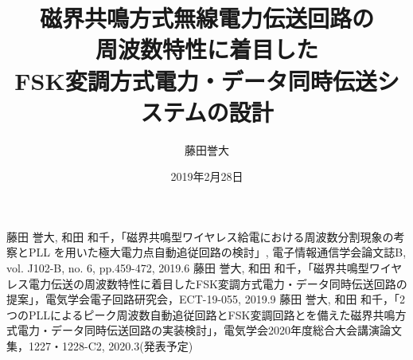 \documentclass[a4,12pt,dvipdfmx]{jreport}
\title{磁界共鳴方式無線電力伝送回路の\\周波数特性に着目した \\ FSK変調方式電力・データ同時伝送システムの設計}
\date{2019年2月28日}
\author{藤田\hspace{1zw}誉大}
\begin{document}
\maketitle[%
]

%
%
%
%            
%        




\begin{thepublished}{99}
藤田 誉大, 和田 和千，「磁界共鳴型ワイヤレス給電における周波数分割現象の考察とPLL を用いた極大電力点自動追従回路の検討」, 電子情報通信学会論文誌B, vol. J102-B, no. 6, pp.459-472, 2019.6
藤田 誉大, 和田 和千，「磁界共鳴型ワイヤレス電力伝送の周波数特性に着目したFSK変調方式電力・データ同時伝送回路の提案」，電気学会電子回路研究会，ECT-19-055, 2019.9
藤田 誉大, 和田 和千，「2つのPLLによるピーク周波数自動追従回路とFSK変調回路とを備えた磁界共鳴方式電力・データ同時伝送回路の実装検討」，電気学会2020年度総合大会講演論文集，1227・1228-C2, 2020.3(発表予定)


\end{thepublished}
\newpage



\appendix

\end{document}
